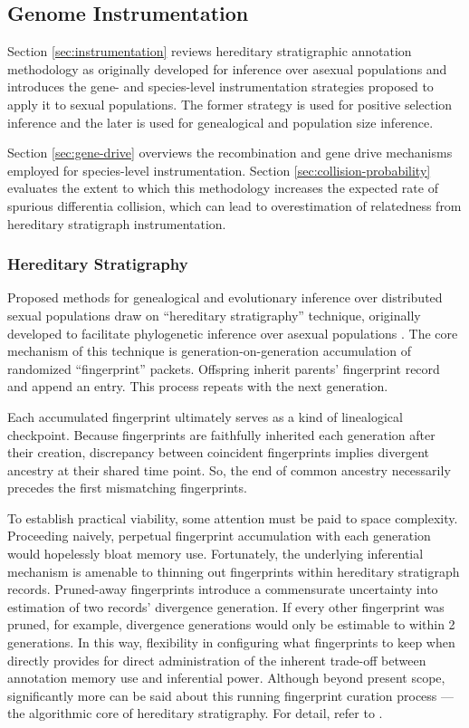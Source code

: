 \subsection{Genome Instrumentation}
\label{sec:genome-instrumentation}

Section \ref{sec:instrumentation} reviews hereditary stratigraphic annotation methodology as originally developed for inference over asexual populations and introduces the gene- and species-level instrumentation strategies proposed to apply it to sexual populations.
The former strategy is used for positive selection inference and the later is used for genealogical and population size inference.

Section \ref{sec:gene-drive} overviews the recombination and gene drive mechanisms employed for species-level instrumentation.
Section \ref{sec:collision-probability} evaluates the extent to which this methodology increases the expected rate of spurious differentia collision, which can lead to overestimation of relatedness from hereditary stratigraph instrumentation.


% 
% 
\subsubsection{Hereditary Stratigraphy}

Proposed methods for genealogical and evolutionary inference over distributed sexual populations draw on ``hereditary stratigraphy'' technique, originally developed to facilitate phylogenetic inference over asexual populations \citep{moreno2022hstrat}.
The core mechanism of this technique is generation-on-generation accumulation of randomized ``fingerprint'' packets.
Offspring inherit parents' fingerprint record and append an entry.
This process repeats with the next generation.

Each accumulated fingerprint ultimately serves as a kind of linealogical checkpoint.
Because fingerprints are faithfully inherited each generation after their creation, discrepancy between coincident fingerprints implies divergent ancestry at their shared time point.
So, the end of common ancestry necessarily precedes the first mismatching fingerprints.

To establish practical viability, some attention must be paid to space complexity.
Proceeding naively, perpetual fingerprint accumulation with each generation would hopelessly bloat memory use.
Fortunately, the underlying inferential mechanism is amenable to thinning out fingerprints within hereditary stratigraph records.
Pruned-away fingerprints introduce a commensurate uncertainty into estimation of two records' divergence generation.
If every other fingerprint was pruned, for example, divergence generations would only be estimable to within 2 generations.
In this way, flexibility in configuring what fingerprints to keep when directly provides for direct administration of the inherent trade-off between annotation memory use and inferential power.
Although beyond present scope, significantly more can be said about this running fingerprint curation process --- the algorithmic core of hereditary stratigraphy.
For detail, refer to \citep{moreno2022hereditary}.

